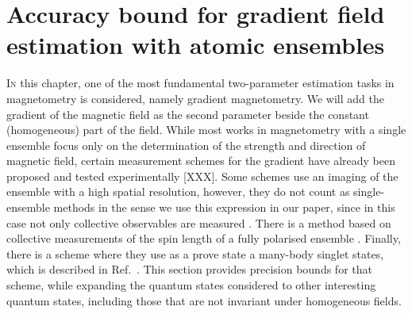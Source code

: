 \section[Metrology of the gradient magnetic field]
{Accuracy bound for gradient field estimation with atomic ensembles}
\label{sec:gm}



\lettrine[lines=2, findent=3pt, nindent=0pt]{I}{n} this chapter, one of the most fundamental two-parameter estimation tasks in magnetometry is considered, namely gradient magnetometry.
We will add the gradient of the magnetic field as the second parameter beside the constant (homogeneous) part of the field.
While most works in magnetometry with a single ensemble focus only on the determination of the strength and direction of magnetic field, certain measurement schemes for the gradient have already been proposed and tested experimentally [XXX].
Some schemes use an imaging of the ensemble with a high spatial resolution, however, they do not count as single-ensemble methods in the sense we use this expression in our paper, since in this case not only collective observables are measured  \cite{Vengalattore2007,Zhou2010,Koschorreck2011}.
There is a method based on collective measurements of the spin length of a fully polarised ensemble \cite{Behbood2013}.
Finally, there is a scheme where they use as a prove state a many-body singlet states, which is described in Ref.~\cite{Urizar-Lanz2013}.
This section provides precision bounds for that scheme, while expanding the quantum states considered to other interesting quantum states, including those that are not invariant under homogeneous fields.

